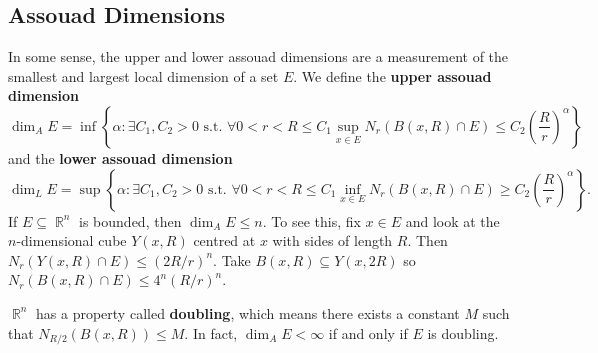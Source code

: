 \documentclass[11pt, a4paper]{memoir}
\DeclareMathOperator{\R}{{\mathbb{R}}}
\theoremstyle{change}
\theoremstyle{plain}
\theoremstyle{nonumberplain}
\newcommand{\defn}[1]{{\boldmath\bfseries #1}}
\numberwithin{equation}{section}
\begin{document}
\subsection{Assouad Dimensions}
In some sense, the upper and lower assouad dimensions are a measurement of the smallest and largest local dimension of a set $E$.
We define the \defn{upper assouad dimension}
\begin{equation*}
    \dim_A E = \inf\left\{\alpha:\exists C_1,C_2>0\text{ s.t. }\forall 0<r<R\leq C_1\sup_{x\in E}N_r(B(x,R)\cap E)\leq C_2\left(\frac{R}{r}\right)^\alpha\right\}
\end{equation*}
and the \defn{lower assouad dimension}
\begin{equation*}
    \dim_L E = \sup\left\{\alpha:\exists C_1,C_2>0\text{ s.t. }\forall 0<r<R\leq C_1\inf_{x\in E}N_r(B(x,R)\cap E)\geq C_2\left(\frac{R}{r}\right)^\alpha\right\}.
\end{equation*}
If $E\subseteq\R^n$ is bounded, then $\dim_A E\leq n$.
To see this, fix $x\in E$ and look at the $n$-dimensional cube $Y(x,R)$ centred at $x$ with sides of length $R$.
Then $N_r(Y(x,R)\cap E)\leq(2R/r)^n$.
Take $B(x,R)\subseteq Y(x,2R)$ so $N_r(B(x,R)\cap E)\leq 4^n(R/r)^n$.

$\R^n$ has a property called \defn{doubling}, which means there exists a constant $M$ such that $N_{R/2}(B(x,R))\leq M$.
In fact, $\dim_A E<\infty$ if and only if $E$ is doubling.
\end{document}

